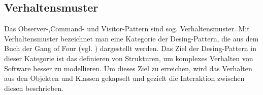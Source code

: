 

\subsection{Verhaltensmuster}

Das Observer-,Command- und Visitor-Pattern sind sog. Verhaltensmuster.
Mit Verhaltensmuster bezeichnet man eine Kategorie der Desing-Pattern, die aus dem Buch der Gang of Four (vgl. \cite{GOF95}) dargestellt werden. Das Ziel der Desing-Pattern in dieser Kategorie ist das definieren von Strukturen, um komplexes Verhalten von Software besser zu modellieren. Um dieses Ziel zu erreichen, wird das Verhalten aus den Objekten und Klassen gekapselt und gezielt die Interaktion zwischen diesen beschrieben.


